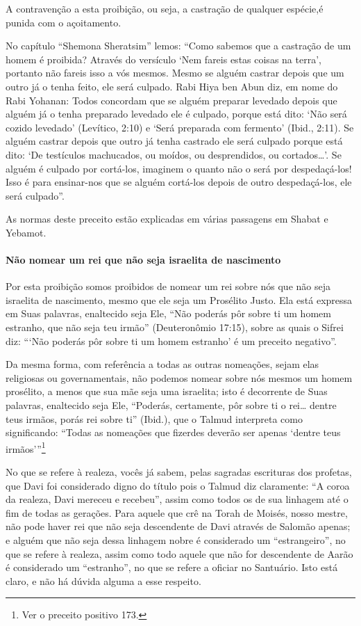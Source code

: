 A contravenção a esta proibição, ou seja, a castração de qualquer
espécie,é punida com o açoitamento.

No capítulo ``Shemona Sheratsim'' lemos: ``Como sabemos que a castração
de um homem é proibida? Através do versículo `Nem fareis estas coisas na
terra', portanto não fareis isso a vós mesmos. Mesmo se alguém castrar
depois que um outro já o tenha feito, ele será culpado. Rabi Hiya ben
Abun diz, em nome do Rabi Yohanan: Todos concordam que se alguém
preparar levedado depois que alguém já o tenha preparado levedado ele é
culpado, porque está dito: `Não será cozido levedado' (Levítico, 2:10) e
`Será preparada com fermento' (Ibid., 2:11). Se alguém castrar depois
que outro já tenha castrado ele será culpado porque está dito: `De
testículos machucados, ou moídos, ou desprendidos, ou cortados\ldots{}'. Se
alguém é culpado por cortá-los, imaginem o quanto não o será por
despedaçá-los! Isso é para ensinar-nos que se alguém cortá-los depois de
outro despedaçá-los, ele será culpado''.

As normas deste preceito estão explicadas em várias passagens em Shabat
e Yebamot.

\paragraph{Não nomear um rei que não seja israelita de nascimento}

Por esta proibição somos proibidos de nomear um rei sobre nós que não
seja israelita de nascimento, mesmo que ele seja um Prosélito Justo. Ela
está expressa em Suas palavras, enaltecido seja Ele, ``Não poderás pôr
sobre ti um homem estranho, que não seja teu irmão'' (Deuteronômio
17:15), sobre as quais o Sifrei diz: ```Não poderás pôr sobre ti um homem estranho' é
um preceito negativo''.

Da mesma forma, com referência a todas as outras nomeações, sejam elas
religiosas ou governamentais, não podemos nomear sobre nós mesmos um
homem prosélito, a menos que sua mãe seja uma israelita; isto é
decorrente de Suas palavras, enaltecido seja Ele, ``Poderás,
certamente, pôr sobre ti o rei\ldots{} dentre teus irmãos, porás rei sobre
ti'' (Ibid.), que o Talmud interpreta como significando: ``Todas as
nomeações que fizerdes deverão ser apenas `dentre teus
irmãos'''\footnote{Ver o preceito positivo 173.}

No que se refere à realeza, vocês já sabem, pelas sagradas escrituras
dos profetas, que Davi foi considerado digno do título pois o Talmud diz
claramente: ``A coroa da realeza, Davi mereceu e recebeu'', assim como
todos os de sua linhagem até o fim de todas as gerações. Para aquele que
crê na Torah de Moisés, nosso mestre, não pode haver rei que não seja
descendente de Davi através de Salomão apenas; e alguém que não seja
dessa linhagem nobre é considerado um ``estrangeiro'', no que se refere
à realeza, assim como todo aquele que não for descendente de Aarão é
considerado um ``estranho'', no que se refere a oficiar no Santuário.
Isto está claro, e não há dúvida alguma a esse respeito.

